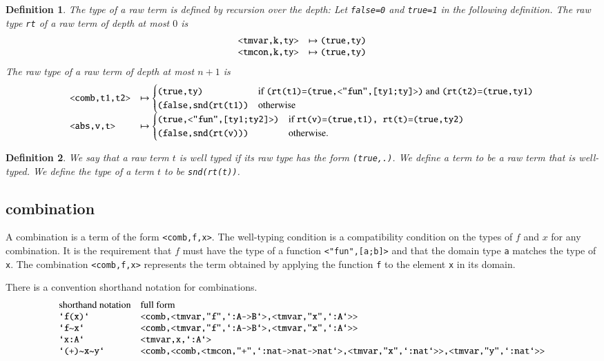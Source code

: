 \documentclass[cup9a]{cupbook}
\newtheorem{definition}{Definition}[chapter]
\begin{document}
\begin{definition} The type of a raw term is defined by recursion over the depth: Let \verb!false=0! and \verb!true=1! in
the following definition.
The raw type \verb!rt! of a raw term of depth at most $0$ is
$$
\begin{array}{lll}
\verb!<tmvar,k,ty>!&\mapsto \verb!(true,ty)!\\
\verb!<tmcon,k,ty>!&\mapsto \verb!(true,ty)!
\end{array}
$$
The raw type of a raw term of depth at most $n+1$ is
$$
\begin{array}{lll}
\verb!<comb,t1,t2>!&\mapsto 
\begin{cases}
\verb!(true,ty)! &\hbox{if } \verb!(rt(t1)=(true,<"fun",[ty1;ty]>)! \hbox{ and } \verb!(rt(t2)=(true,ty1)!\\
\verb!(false,snd(rt(t1))! & \hbox{otherwise}
\end{cases}\\
\verb!<abs,v,t>!&\mapsto
 \begin{cases}
\verb!(true,<"fun",[ty1;ty2]>)!&\hbox{if } \verb!rt(v)=(true,t1), rt(t)=(true,ty2)!\\
\verb!(false,snd(rt(v)))!&\hbox{otherwise}.
\end{cases}
\end{array}
$$
\end{definition}

\begin{definition}
We say that a raw term $t$ is well typed if its raw type has the form \verb!(true,.)!.  We define a term to be a raw term that is well-typed.  We define the type of a term $t$ to be \verb!snd(rt(t))!.
\end{definition}

\subsection{combination}

A combination is a term of the form \verb!<comb,f,x>!.  The well-typing condition is a compatibility condition on the types of $f$ and $x$ for any combination.  It is the requirement that $f$ must have the type of a function
\verb!<"fun",[a;b]>! and that the domain type \verb!a! matches the type of \verb!x!.  The combination \verb!<comb,f,x>! represents the term obtained by applying the function \verb!f! to the element \verb!x! in its domain.

There is a convention shorthand notation for combinations.
$$
\begin{array}{lll}
\hbox{shorthand notation}&\hbox{full form}\\
\verb!`f(x)`! & \verb!<comb,<tmvar,"f",`:A->B`>,<tmvar,"x",`:A`>>!\\
\verb!`f~x`! & \verb!<comb,<tmvar,"f",`:A->B`>,<tmvar,"x",`:A`>>!\\
\verb!`x:A`!&\verb!<tmvar,x,`:A`>!\\
\verb!`(+)~x~y`! & \verb!<comb,<comb,<tmcon,"+",`:nat->nat->nat`>,<tmvar,"x",`:nat`>>,<tmvar,"y",`:nat`>>!\\
\end{array}
$$
\end{document}
